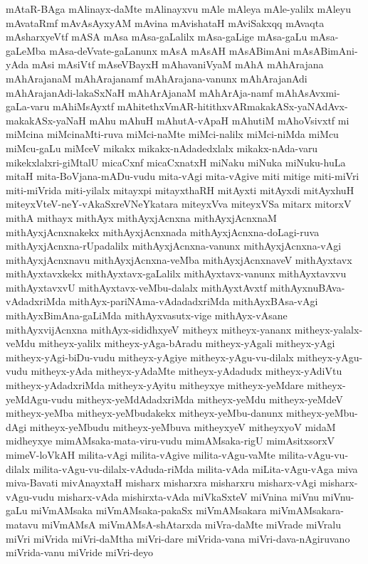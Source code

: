 {mAtaR-BAga
mAlinayx-daMte
mAlinayxvu
mAle
mAleya
mAle-yalilx
mAleyu
mAvataRmf
mAvAsAyxyAM
mAvina
mAvishataH
mAviSakxqq
mAvaqta
mAsharxyeVtf
mASA
mAsa
mAsa-gaLalilx
mAsa-gaLige
mAsa-gaLu
mAsa-gaLeMba
mAsa-deVvate-gaLanunx
mAsA
mAsAH
mAsABimAni
mAsABimAni-yAda
mAsi
mAsiVtf
mAseVBayxH
mAhavaniVyaM
mAhA
mAhArajana
mAhArajanaM
mAhArajanamf
mAhArajana-vanunx
mAhArajanAdi
mAhArajanAdi-lakaSxNaH
mAhArAjanaM
mAhArAja-namf
mAhAsAvxmi-gaLa-varu
mAhiMsAyxtf
mAhitethxVmAR-hitithxvARmakakASx-yaNAdAvx-makakASx-yaNaH
mAhu
mAhuH
mAhutA-vApaH
mAhutiM
mAhoVsivxtf
mi
miMcina
miMcinaMti-ruva
miMci-naMte
miMci-nalilx
miMci-niMda
miMcu
miMcu-gaLu
miMceV
mikakx
mikakx-nAdadedxlalx
mikakx-nAda-varu
mikekxlalxri-giMtalU
micaCxnf
micaCxnatxH
miNaku
miNuka
miNuku-huLa
mitaH
mita-BoVjana-mADu-vudu
mita-vAgi
mita-vAgive
miti
mitige
miti-miVri
miti-miVrida
miti-yilalx
mitayxpi
mitayxthaRH
mitAyxti
mitAyxdi
mitAyxhuH
miteyxVteV-neY-vAkaSxreVNeYkatara
miteyxVva
miteyxVSa
mitarx
mitorxV
mithA
mithayx
mithAyx
mithAyxjAcnxna
mithAyxjAcnxnaM
mithAyxjAcnxnakekx
mithAyxjAcnxnada
mithAyxjAcnxna-doLagi-ruva
mithAyxjAcnxna-rUpadalilx
mithAyxjAcnxna-vanunx
mithAyxjAcnxna-vAgi
mithAyxjAcnxnavu
mithAyxjAcnxna-veMba
mithAyxjAcnxnaveV
mithAyxtavx
mithAyxtavxkekx
mithAyxtavx-gaLalilx
mithAyxtavx-vanunx
mithAyxtavxvu
mithAyxtavxvU
mithAyxtavx-veMbu-dalalx
mithAyxtAvxtf
mithAyxnuBAva-vAdadxriMda
mithAyx-pariNAma-vAdadadxriMda
mithAyxBAsa-vAgi
mithAyxBimAna-gaLiMda
mithAyxvasutx-vige
mithAyx-vAsane
mithAyxvijAcnxna
mithAyx-sididhxyeV
mitheyx
mitheyx-yananx
mitheyx-yalalx-veMdu
mitheyx-yalilx
mitheyx-yAga-bAradu
mitheyx-yAgali
mitheyx-yAgi
mitheyx-yAgi-biDu-vudu
mitheyx-yAgiye
mitheyx-yAgu-vu-dilalx
mitheyx-yAgu-vudu
mitheyx-yAda
mitheyx-yAdaMte
mitheyx-yAdadudx
mitheyx-yAdiVtu
mitheyx-yAdadxriMda
mitheyx-yAyitu
mitheyxye
mitheyx-yeMdare
mitheyx-yeMdAgu-vudu
mitheyx-yeMdAdadxriMda
mitheyx-yeMdu
mitheyx-yeMdeV
mitheyx-yeMba
mitheyx-yeMbudakekx
mitheyx-yeMbu-danunx
mitheyx-yeMbu-dAgi
mitheyx-yeMbudu
mitheyx-yeMbuva
mitheyxyeV
mitheyxyoV
midaM
midheyxye
mimAMsaka-mata-viru-vudu
mimAMsaka-rigU
mimAsitxsorxV
mimeV-loVkAH
milita-vAgi
milita-vAgive
milita-vAgu-vaMte
milita-vAgu-vu-dilalx
milita-vAgu-vu-dilalx-vAduda-riMda
milita-vAda
miLita-vAgu-vAga
miva
miva-Bavati
mivAnayxtaH
misharx
misharxra
misharxru
misharx-vAgi
misharx-vAgu-vudu
misharx-vAda
mishirxta-vAda
miVkaSxteV
miVnina
miVnu
miVnu-gaLu
miVmAMsaka
miVmAMsaka-pakaSx
miVmAMsakara
miVmAMsakara-matavu
miVmAMsA
miVmAMsA-shAtarxda
miVra-daMte
miVrade
miVralu
miVri
miVrida
miVri-daMtha
miVri-dare
miVrida-vana
miVri-dava-nAgiruvano
miVrida-vanu
miVride
miVri-deyo
}
